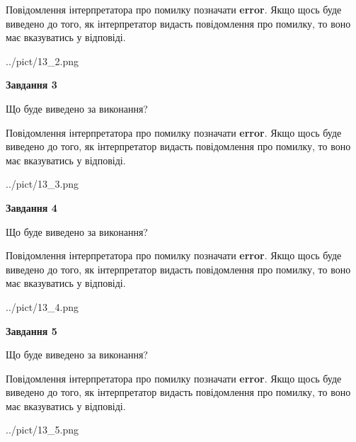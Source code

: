\documentclass[12pt, ukrainian]{article}
\begin{document}
{\begin {large}
Повідомлення інтерпретатора про помилку позначати \textbf{error}.
Якщо щось буде виведено до того, як інтерпретатор видасть повідомлення про помилку, 
то воно має вказуватись у відповіді. \par


\begin{center}
	{../pict/13_2.png}
\end{center}
\newpage

{\begin {center}\textbf{Завдання 3}\end {center}}\par
Що буде виведено за виконання?

Повідомлення інтерпретатора про помилку позначати \textbf{error}.
Якщо щось буде виведено до того, як інтерпретатор видасть повідомлення про помилку, 
то воно має вказуватись у відповіді. \par


\begin{center}
	{../pict/13_3.png}
\end{center}
\newpage

{\begin {center}\textbf{Завдання 4}\end {center}}\par
Що буде виведено за виконання?

Повідомлення інтерпретатора про помилку позначати \textbf{error}.
Якщо щось буде виведено до того, як інтерпретатор видасть повідомлення про помилку, 
то воно має вказуватись у відповіді. \par


\begin{center}
	{../pict/13_4.png}
\end{center}
\newpage

{\begin {center}\textbf{Завдання 5}\end {center}}\par
Що буде виведено за виконання?

Повідомлення інтерпретатора про помилку позначати \textbf{error}.
Якщо щось буде виведено до того, як інтерпретатор видасть повідомлення про помилку, 
то воно має вказуватись у відповіді. \par


\begin{center}
	{../pict/13_5.png}
\end{center}
\newpage


\end{large}}
\end{document}
